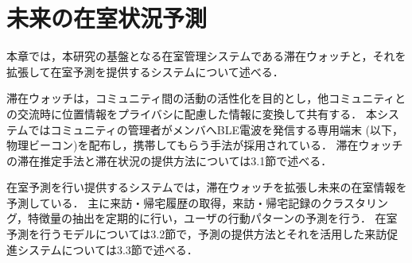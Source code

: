 \chapter{未来の在室状況予測}
\thispagestyle{myheadings}


本章では，本研究の基盤となる在室管理システムである滞在ウォッチ\cite{staywatch}と，それを拡張して在室予測を提供するシステム\cite{hayashi}について述べる．


滞在ウォッチは，コミュニティ間の活動の活性化を目的とし，他コミュニティとの交流時に位置情報をプライバシに配慮した情報に変換して共有する．
本システムではコミュニティの管理者がメンバへBLE電波を発信する専用端末 (以下，物理ビーコン)を配布し，携帯してもらう手法が採用されている．
滞在ウォッチの滞在推定手法と滞在状況の提供方法については3.1節で述べる．


在室予測を行い提供するシステムでは，滞在ウォッチを拡張し未来の在室情報を予測している．
主に来訪・帰宅履歴の取得，来訪・帰宅記録のクラスタリング，特徴量の抽出を定期的に行い，ユーザの行動パターンの予測を行う．
在室予測を行うモデルについては3.2節で，予測の提供方法とそれを活用した来訪促進システムについては3.3節で述べる．



